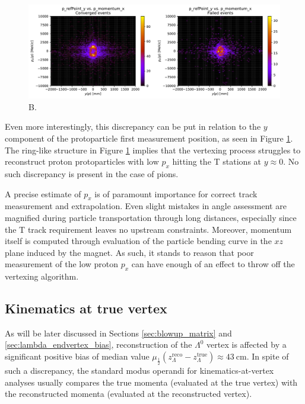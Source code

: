\begin{figure}[t]
	\centering
	\includegraphics[width=\textwidth]{graphics/03-vertex_reconstruction/pp_p_refPoint_y_vs_p_momentum_x.pdf}
	\caption{B.}
	\label{fig:pp_p_px_vs_refpy_conv_vs_failed}
\end{figure}

Even more interestingly, this discrepancy can be put in relation to the $y$ component of the protoparticle first measurement position, as seen in Figure \ref{fig:pp_p_px_vs_refpy_conv_vs_failed}.
The ring-like structure in Figure \ref{fig:pp_p_px_vs_refpy_conv_vs_failed} implies that the vertexing process struggles to reconstruct proton protoparticles with low $p_x$ hitting the T stations at $y\approx 0$.
No such discrepancy is present in the case of pions.

A precise estimate of $p_x$ is of paramount importance for correct track measurement and extrapolation.
Even slight mistakes in angle assessment are magnified during particle transportation through long distances, especially since the T track requirement leaves no upstream constraints.
Moreover, momentum itself is computed through evaluation of the particle bending curve in the $xz$ plane induced by the magnet.
As such, it stands to reason that poor measurement of the low proton $p_x$ can have enough of an effect to throw off the vertexing algorithm.

\subsection{Kinematics at true vertex}
\label{sec:3:true_vtx_kinematics}
As will be later discussed in Sections \ref{sec:blowup_matrix} and \ref{sec:lambda_endvertex_bias}, reconstruction of the $\Lambda^0$ vertex is affected by a significant positive bias of median value $\mu_\frac{1}{2} \left(z_\Lambda^\text{reco} - z_\Lambda^\text{true}\right) \approx \SI{43}{\centi\meter}$.
In spite of such a discrepancy, the standard modus operandi for kinematics-at-vertex analyses usually compares the true momenta (evaluated at the true vertex) with the reconstructed momenta (evaluated at the reconstructed vertex).


